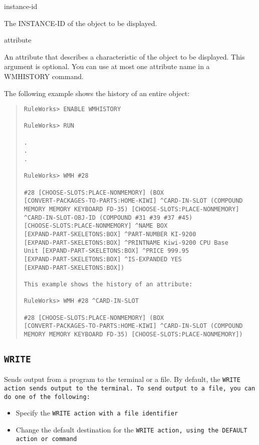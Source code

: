 {{instance-id

The INSTANCE-ID of the object to be displayed.

attribute

An attribute that describes a characteristic of the object to
be displayed. This argument is optional. You can use at most
one attribute name in a WMHISTORY command.

\Example

The following example shows the history of an entire object:

\begin{quote}
\begin{verbatim}
RuleWorks> ENABLE WMHISTORY

RuleWorks> RUN

.
.
.

RuleWorks> WMH #28

#28 [CHOOSE-SLOTS:PLACE-NONMEMORY] (BOX
[CONVERT-PACKAGES-TO-PARTS:HOME-KIWI] ^CARD-IN-SLOT (COMPOUND
MEMORY MEMORY KEYBOARD FD-35) [CHOOSE-SLOTS:PLACE-NONMEMORY]
^CARD-IN-SLOT-OBJ-ID (COMPOUND #31 #39 #37 #45)
[CHOOSE-SLOTS:PLACE-NONMEMORY] ^NAME BOX
[EXPAND-PART-SKELETONS:BOX] ^PART-NUMBER KI-9200
[EXPAND-PART-SKELETONS:BOX] ^PRINTNAME Kiwi-9200 CPU Base
Unit [EXPAND-PART-SKELETONS:BOX] ^PRICE 999.95
[EXPAND-PART-SKELETONS:BOX] ^IS-EXPANDED YES
[EXPAND-PART-SKELETONS:BOX])

This example shows the history of an attribute:

RuleWorks> WMH #28 ^CARD-IN-SLOT

#28 [CHOOSE-SLOTS:PLACE-NONMEMORY] (BOX
[CONVERT-PACKAGES-TO-PARTS:HOME-KIWI] ^CARD-IN-SLOT (COMPOUND
MEMORY MEMORY KEYBOARD FD-35) [CHOOSE-SLOTS:PLACE-NONMEMORY])
\end{verbatim}
\end{quote}

\subsection{\tt{WRITE}}

Sends output from a program to the terminal or a file. By
default, the \tt{WRITE} action sends output to the terminal. To
send output to a file, you can do one of the following:
\begin{itemize}
\item Specify the \tt{WRITE} action with a file identifier
\item Change the default destination for the \tt{WRITE} action, using
the \tt{DEFAULT} action or command
\end{itemize}

}}
